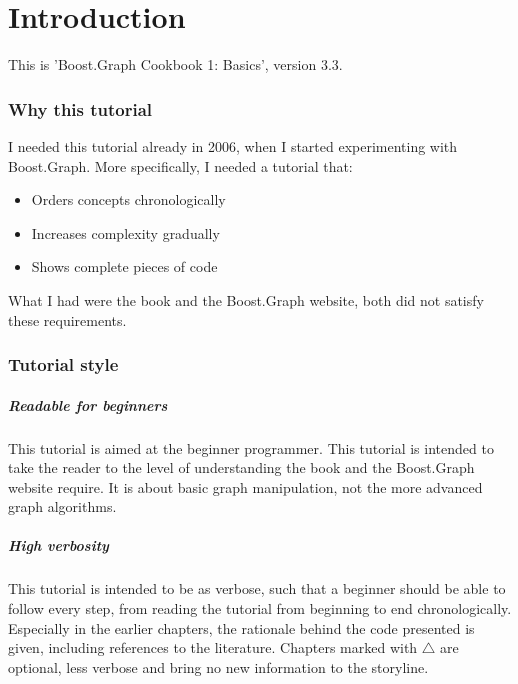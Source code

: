\chapter{Introduction}

This is 'Boost.Graph Cookbook 1: Basics', version 3.3.

\subsection{Why this tutorial}

I needed this tutorial already in 2006, when I started experimenting with
Boost.Graph.
More specifically, I needed a tutorial that:

\begin{itemize}
  \item Orders concepts chronologically
  \item Increases complexity gradually
  \item Shows complete pieces of code
\end{itemize}

What I had were the book \cite{siek2001boost}
and the Boost.Graph website, both did not satisfy these requirements.

\subsection{Tutorial style}

\paragraph{Readable for beginners}

This tutorial is aimed at the beginner programmer.
This tutorial is intended to take the reader to the level of understanding
the book \cite{siek2001boost}
and the Boost.Graph website require.
It is about basic graph manipulation, not the more advanced graph algorithms.
 
\paragraph{High verbosity}

This tutorial is intended to be as verbose, such that a beginner should
be able to follow every step, from reading the tutorial from beginning
to end chronologically.
Especially in the earlier chapters, the rationale behind the code presented
is given, including references to the literature.
Chapters marked with $\triangle$ are optional, 
less verbose and bring no new information to the storyline.

